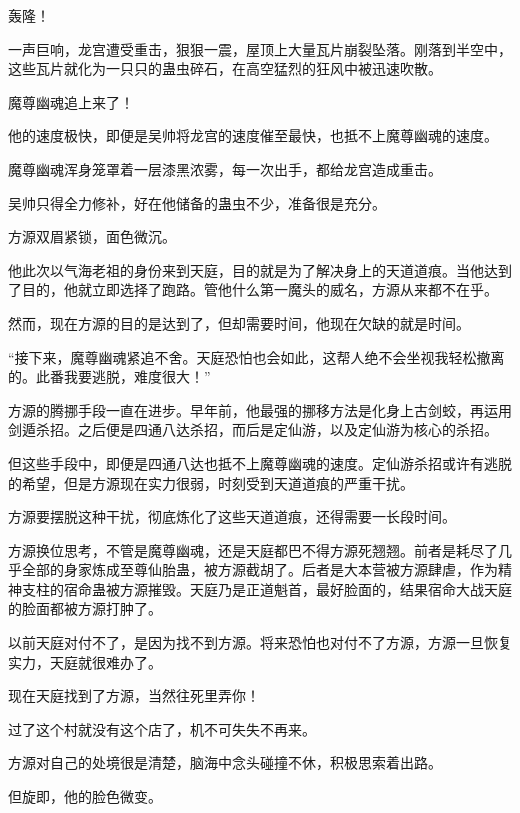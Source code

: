 
\begin{this_body}



轰隆！

一声巨响，龙宫遭受重击，狠狠一震，屋顶上大量瓦片崩裂坠落。刚落到半空中，这些瓦片就化为一只只的蛊虫碎石，在高空猛烈的狂风中被迅速吹散。

魔尊幽魂追上来了！

他的速度极快，即便是吴帅将龙宫的速度催至最快，也抵不上魔尊幽魂的速度。

魔尊幽魂浑身笼罩着一层漆黑浓雾，每一次出手，都给龙宫造成重击。

吴帅只得全力修补，好在他储备的蛊虫不少，准备很是充分。

方源双眉紧锁，面色微沉。

他此次以气海老祖的身份来到天庭，目的就是为了解决身上的天道道痕。当他达到了目的，他就立即选择了跑路。管他什么第一魔头的威名，方源从来都不在乎。

然而，现在方源的目的是达到了，但却需要时间，他现在欠缺的就是时间。

“接下来，魔尊幽魂紧追不舍。天庭恐怕也会如此，这帮人绝不会坐视我轻松撤离的。此番我要逃脱，难度很大！”

方源的腾挪手段一直在进步。早年前，他最强的挪移方法是化身上古剑蛟，再运用剑遁杀招。之后便是四通八达杀招，而后是定仙游，以及定仙游为核心的杀招。

但这些手段中，即便是四通八达也抵不上魔尊幽魂的速度。定仙游杀招或许有逃脱的希望，但是方源现在实力很弱，时刻受到天道道痕的严重干扰。

方源要摆脱这种干扰，彻底炼化了这些天道道痕，还得需要一长段时间。

方源换位思考，不管是魔尊幽魂，还是天庭都巴不得方源死翘翘。前者是耗尽了几乎全部的身家炼成至尊仙胎蛊，被方源截胡了。后者是大本营被方源肆虐，作为精神支柱的宿命蛊被方源摧毁。天庭乃是正道魁首，最好脸面的，结果宿命大战天庭的脸面都被方源打肿了。

以前天庭对付不了，是因为找不到方源。将来恐怕也对付不了方源，方源一旦恢复实力，天庭就很难办了。

现在天庭找到了方源，当然往死里弄你！

过了这个村就没有这个店了，机不可失失不再来。

方源对自己的处境很是清楚，脑海中念头碰撞不休，积极思索着出路。

但旋即，他的脸色微变。


\end{this_body}
